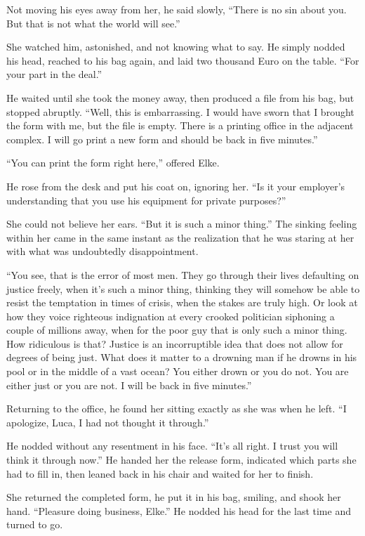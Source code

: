 Not moving his eyes away from her, he said slowly, ``There is no sin about you. But that is not what the world will see.''

She watched him, astonished, and not knowing what to say. He simply nodded his head, reached to his bag again, and laid two thousand Euro on the table. ``For your part in the deal.''

He waited until she took the money away, then produced a file from his bag, but stopped abruptly. ``Well, this is embarrassing. I would have sworn that I brought the form with me, but the file is empty. There is a printing office in the adjacent complex. I will go print a new form and should be back in five minutes.''

``You can print the form right here,'' offered Elke.

He rose from the desk and put his coat on, ignoring her. ``Is it your employer's understanding that you use his equipment for private purposes?''

She could not believe her ears. ``But it is such a minor thing.'' The sinking feeling within her came in the same instant as the realization that he was staring at her with what was undoubtedly disappointment.

``You see, that is the error of most men. They go through their lives defaulting on justice freely, when it's such a minor thing, thinking they will somehow be able to resist the temptation in times of crisis, when the stakes are truly high. Or look at how they voice righteous indignation at every crooked politician siphoning a couple of millions away, when for the poor guy that is only such a minor thing. How ridiculous is that? Justice is an incorruptible idea that does not allow for degrees of being just. What does it matter to a drowning man if he drowns in his pool or in the middle of a vast ocean? You either drown or you do not. You are either just or you are not. I will be back in five minutes.''

Returning to the office, he found her sitting exactly as she was when he left. ``I apologize, Luca, I had not thought it through.''

He nodded without any resentment in his face. ``It's all right. I trust you will think it through now.'' He handed her the release form, indicated which parts she had to fill in, then leaned back in his chair and waited for her to finish.

She returned the completed form, he put it in his bag, smiling, and shook her hand. ``Pleasure doing business, Elke.'' He nodded his head for the last time and turned to go.

